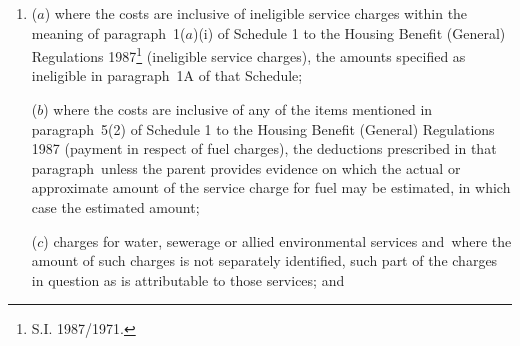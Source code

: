 \documentclass[12pt,a4paper]{article}
\begin{document}
\begin{enumerate}\item[]

($a$) where the costs are inclusive of ineligible service charges within the meaning of paragraph~1($a$)(i) of Schedule 1 to the Housing Benefit (General) Regulations 1987\footnote{\frenchspacing S.I. 1987/1971.} (ineligible service charges), the amounts specified as ineligible in paragraph~1A of that Schedule;

%

($b$) where the costs are inclusive of any of the items mentioned in paragraph~5(2) of Schedule 1 to the Housing Benefit (General) Regulations 1987 (payment in respect of fuel charges), the deductions prescribed in that paragraph~unless the parent provides evidence on which the actual or approximate amount of the service charge for fuel may be estimated, in which case the estimated amount; 

($c$) charges for water, sewerage or allied environmental services and~where the amount of such charges is not separately identified, such part of the charges in question as is attributable to those services;
and


\end{enumerate}
\end{document}
